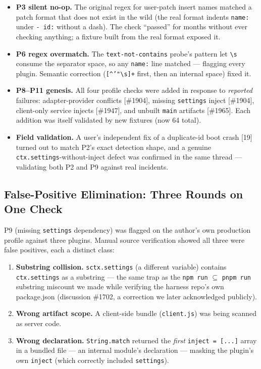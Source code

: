 \documentclass[11pt]{article}
\providecommand{\tightlist}{%
  \setlength{\itemsep}{0pt}\setlength{\parskip}{0pt}}
\begin{document}
\begin{itemize}
\tightlist
\item
  \textbf{P3 silent no-op.} The original regex for user-patch insert
  names matched a patch format that does not exist in the wild (the real
  format indents \texttt{name:} under \texttt{-\ id:} without a dash).
  The check ``passed'' for months without ever checking anything; a
  fixture built from the real format exposed it.
\item
  \textbf{P6 regex overmatch.} The \texttt{text-not-contains} probe's
  pattern let \texttt{\textbackslash{}s} consume the separator space, so
  any \texttt{name:} line matched --- flagging every plugin. Semantic
  correction (\texttt{[\^{}'"\textbackslash{}s]+}
  first, then an internal space) fixed it.
\item
  \textbf{P8--P11 genesis.} All four profile checks were added in
  response to \emph{reported} failures: adapter-provider conflicts
  [\#1904], missing \texttt{settings} inject [\#1904],
  client-only service injects [\#1947], and unbuilt \texttt{main}
  artifacts [\#1965]. Each addition was itself validated by new
  fixtures (now 64 total).
\item
  \textbf{Field validation.} A user's independent fix of a duplicate-id
  boot crash [19] turned out to match P2's exact detection shape,
  and a genuine \texttt{ctx.settings}-without-inject defect was
  confirmed in the same thread --- validating both P2 and P9 against
  real incidents.
\end{itemize}

\subsection{False-Positive Elimination: Three Rounds on One
Check}\label{false-positive-elimination-three-rounds-on-one-check}

P9 (missing \texttt{settings} dependency) was flagged on the author's
own production profile against three plugins. Manual source verification
showed all three were false positives, each a distinct class:

\begin{enumerate}
\def\labelenumi{\arabic{enumi}.}
\tightlist
\item
  \textbf{Substring collision.} \texttt{sctx.settings} (a different
  variable) contains \texttt{ctx.settings} as a substring --- the same
  trap as the \texttt{npm\ run}  $\subseteq$  \texttt{pnpm\ run} substring miscount
  we made while verifying the harness repo's own package.json
  (discussion \#1702, a correction we later acknowledged publicly).
\item
  \textbf{Wrong artifact scope.} A client-side bundle
  (\texttt{client.js}) was being scanned as server code.
\item
  \textbf{Wrong declaration.} \texttt{String.match} returned the
  \emph{first} \texttt{inject\ =\ [...]} array in a bundled file ---
  an internal module's declaration --- masking the plugin's own
  \texttt{inject} (which correctly included \texttt{settings}).
\end{enumerate}
\end{document}
